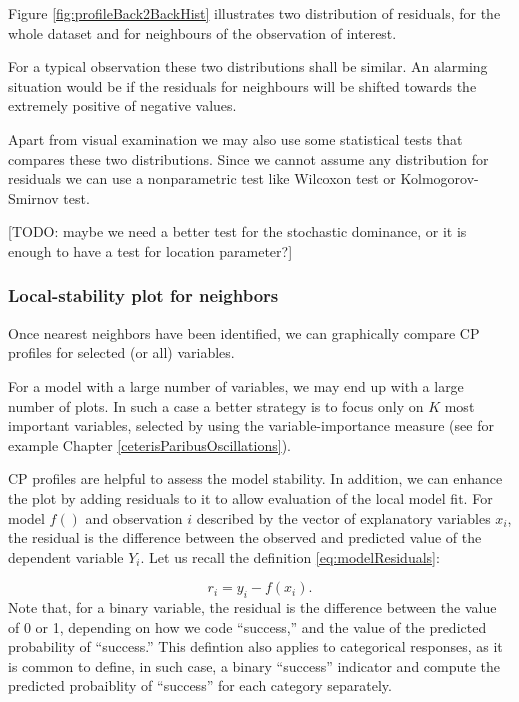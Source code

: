 \documentclass[12pt,]{krantz}
\begin{document}
Figure \ref{fig:profileBack2BackHist} illustrates two distribution of residuals, for the whole dataset and for neighbours of the observation of interest.

For a typical observation these two distributions shall be similar. An alarming situation would be if the residuals for neighbours will be shifted towards the extremely positive of negative values.

Apart from visual examination we may also use some statistical tests that compares these two distributions. Since we cannot assume any distribution for residuals we can use a nonparametric test like Wilcoxon test or Kolmogorov-Smirnov test.

{[}TODO: maybe we need a better test for the stochastic dominance, or it is enough to have a test for location parameter?{]}

\hypertarget{cPLocDiagProfiles}{%
\subsubsection{Local-stability plot for neighbors}\label{cPLocDiagProfiles}}

Once nearest neighbors have been identified, we can graphically compare CP profiles for selected (or all) variables.

For a model with a large number of variables, we may end up with a large number of plots. In such a case a better strategy is to focus only on \(K\) most important variables, selected by using the variable-importance measure (see for example Chapter \ref{ceterisParibusOscillations}).

CP profiles are helpful to assess the model stability. In addition, we can enhance the plot by adding residuals to it to allow evaluation of the local model fit. For model \(f()\) and observation \(i\) described by the vector of explanatory variables \(x_i\), the residual is the difference between the observed and predicted value of the dependent variable \(Y_i\). Let us recall the definition \eqref{eq:modelResiduals}:

\[
r_i = y_i - f(x_i).
\]
Note that, for a binary variable, the residual is the difference between the value of 0 or 1, depending on how we code ``success,'' and the value of the predicted probability of ``success.'' This defintion also applies to categorical responses, as it is common to define, in such case, a binary ``success'' indicator and compute the predicted probaiblity of ``success'' for each category separately.
\end{document}
